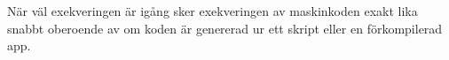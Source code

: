   När väl exekveringen är igång sker exekveringen av maskinkoden exakt lika snabbt oberoende av om koden är genererad ur ett skript eller en förkompilerad app.


\QUESTEND












% 







% 







